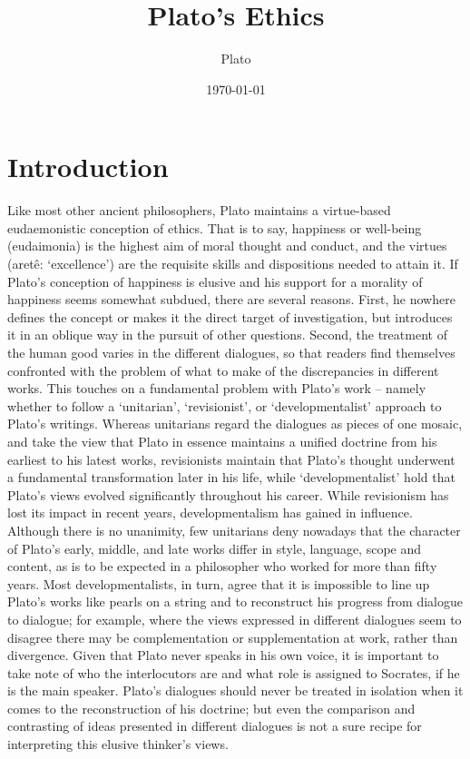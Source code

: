 \documentclass[11pt]{article}
\title{Plato's Ethics}
\author{Plato}
\date{\today}
\begin{document}
	\maketitle

	\section{Introduction}
		Like most other ancient philosophers, Plato maintains a virtue-based eudaemonistic conception of ethics. That is to say, happiness or well-being (eudaimonia) is the highest aim of moral thought and conduct, and the virtues (aretê: ‘excellence’) are the requisite skills and dispositions needed to attain it. If Plato’s conception of happiness is elusive and his support for a morality of happiness seems somewhat subdued, there are several reasons. First, he nowhere defines the concept or makes it the direct target of investigation, but introduces it in an oblique way in the pursuit of other questions. Second, the treatment of the human good varies in the different dialogues, so that readers find themselves confronted with the problem of what to make of the discrepancies in different works. This touches on a fundamental problem with Plato’s work – namely whether to follow a ‘unitarian’, ‘revisionist’, or ‘developmentalist’ approach to Plato’s writings. Whereas unitarians regard the dialogues as pieces of one mosaic, and take the view that Plato in essence maintains a unified doctrine from his earliest to his latest works, revisionists maintain that Plato’s thought underwent a fundamental transformation later in his life, while ‘developmentalist’ hold that Plato’s views evolved significantly throughout his career. While revisionism has lost its impact in recent years, developmentalism has gained in influence. Although there is no unanimity, few unitarians deny nowadays that the character of Plato’s early, middle, and late works differ in style, language, scope and content, as is to be expected in a philosopher who worked for more than fifty years. Most developmentalists, in turn, agree that it is impossible to line up Plato’s works like pearls on a string and to reconstruct his progress from dialogue to dialogue; for example, where the views expressed in different dialogues seem to disagree there may be complementation or supplementation at work, rather than divergence. Given that Plato never speaks in his own voice, it is important to take note of who the interlocutors are and what role is assigned to Socrates, if he is the main speaker. Plato’s dialogues should never be treated in isolation when it comes to the reconstruction of his doctrine; but even the comparison and contrasting of ideas presented in different dialogues is not a sure recipe for interpreting this elusive thinker’s views.
\end{document}

